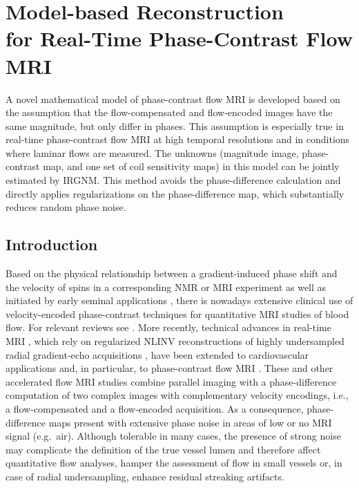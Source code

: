 \chapter[Model-based Reconstruction for Real-Time Phase-Contrast Flow MRI]
{Model-based Reconstruction \\ 
for Real-Time Phase-Contrast Flow MRI}
 \label{Chp:mir-pc}

A novel mathematical model of phase-contrast flow MRI is developed based on the assumption that the flow-compensated and flow-encoded images have the same magnitude, but only differ in phases. This assumption is especially true in real-time phase-contrast flow MRI at high temporal resolutions and in conditions where laminar flows are measured. The unknowns (magnitude image, phase-contrast map, and one set of coil sensitivity maps) in this model can be jointly estimated by \acs{IRGNM}. This method avoids the phase-difference calculation and directly applies regularizations on the phase-difference map, which substantially reduces random phase noise.

\section{Introduction}
Based on the physical relationship between a gradient-induced phase shift and the velocity of spins in a corresponding NMR \cite{1960_PC_Hahn} or MRI experiment \cite{1982_PC_Moran} as well as initiated by early seminal applications \cite{1984_PC_Bryant,1984_PC_Dijk,1991_PC_Pelc}, there is nowadays extensive clinical use of velocity-encoded phase-contrast techniques for quantitative MRI studies of blood flow. For relevant reviews see \cite{2005_PC_Gatehouse,2009_PC_Srichai}. More recently, technical advances in real-time MRI \cite{2010_20ms_Uecker}, which rely on regularized NLINV reconstructions of highly undersampled radial gradient-echo acquisitions \cite{2008_NLINV,2010_NLINV_Heart,2012_Schaetz,2014_Temp_Fidelity}, have been extended to cardiovascular applications \cite{2010_RTCMR_Zhang,2013_SSFP_Voit,2014_RT_Zhang} and, in particular, to phase-contrast flow MRI \cite{2012_PC_Joseph,2014_PC_Joseph,2015_PC_Asym}. These and other accelerated flow MRI studies \cite{2005_PC_ktSENSE,2012_PC_Kim} combine parallel imaging with a phase-difference computation \cite{2004_MRI_Bernstein} of two complex images with complementary velocity encodings, i.e., a flow-compensated and a flow-encoded acquisition. As a consequence, phase-difference maps present with extensive phase noise in areas of low or no MRI signal (e.g.~air). Although tolerable in many cases, the presence of strong noise may complicate the definition of the true vessel lumen and therefore affect quantitative flow analyses, hamper the assessment of flow in small vessels or, in case of radial undersampling, enhance residual streaking artifacts. 

